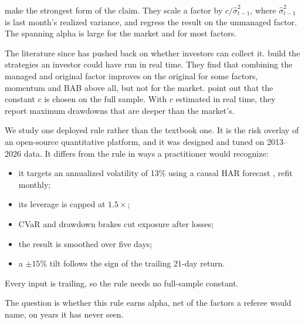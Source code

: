 \documentclass[11pt]{article}
\begin{document}
\citet{moreira2017} make the strongest form of the claim. They scale a
factor by $c/\hat\sigma^2_{t-1}$, where $\hat\sigma^2_{t-1}$ is last month's
realized variance, and regress the result on the unmanaged factor. The
spanning alpha is large for the market and for most factors.

The literature since has pushed back on whether investors can collect it.
\citet{cederburg2020} build the strategies an investor could have run in
real time. They find that combining the managed and original factor improves
on the original for some factors, momentum and BAB above all, but not for
the market. \citet{liu2019} point out that the constant $c$ is chosen on the
full sample. With $c$ estimated in real time, they report maximum drawdowns
that are deeper than the market's.

We study one deployed rule rather than the textbook one. It is the risk
overlay of an open-source quantitative platform, and it was designed and
tuned on 2013--2026 data. It differs from the \citet{moreira2017} rule in
ways a practitioner would recognize:
\begin{itemize}
\item it targets an annualized volatility of 13\% using a causal HAR
  forecast \citep{corsi2009}, refit monthly;
\item its leverage is capped at $1.5\times$;
\item CVaR and drawdown brakes cut exposure after losses;
\item the result is smoothed over five days;
\item a $\pm15\%$ tilt follows the sign of the trailing 21-day return.
\end{itemize}
Every input is trailing, so the rule needs no full-sample constant.

The question is whether this rule earns alpha, net of the factors a referee
would name, on years it has never seen.
\end{document}
